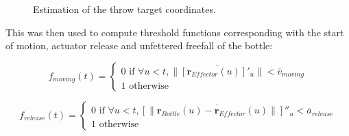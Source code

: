 \documentclass{article}
\begin{document}
\begin{figure}
	\centering
	\caption{Estimation of the throw target coordinates.}
	\label{fig:fig3}
\end{figure}


This was then used to compute threshold functions corresponding with the start of motion, actuator release and unfettered freefall of the bottle:

\begin{equation}
    f_{moving} (t) = \begin{cases}
        0 \text{ if } \forall u < t,  \lVert \overline{\left [  \boldsymbol{r}_{Effector}(u) \right ]'_u} \rVert  < \overline{v}_{moving} \\
        1 \text{ otherwise }
    \end{cases}
\end{equation}

\begin{equation}
    f_{release} (t) = \begin{cases}
        0 \text{ if } \forall u < t, \overline{ \left [ \lVert  \boldsymbol{r}_{Bottle}(u) -  \boldsymbol{r}_{Effector}(u)  \rVert \right ] ''_u} < \overline{a}_{release} \\
        1 \text{ otherwise }
    \end{cases}
\end{equation}
\end{document}
